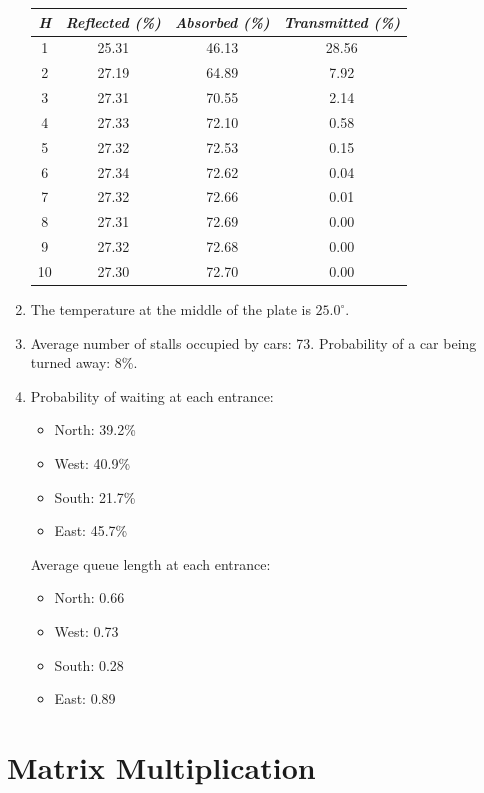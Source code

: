 \begin{enumerate}
\begin{tabular}{|c|c|c|c|}
\hline
{\it H}&{\it Reflected (\%)}&{\it Absorbed (\%)}&{\it Transmitted (\%)}\\
\hline
1 & 25.31 & 46.13 & 28.56 \\ 
2 & 27.19 & 64.89 &  7.92 \\
3 & 27.31 & 70.55 &  2.14 \\
4 & 27.33 & 72.10 &  0.58\\
5 & 27.32 & 72.53 &  0.15 \\
6 & 27.34 & 72.62 &  0.04 \\
7 & 27.32 & 72.66 &  0.01 \\
8 & 27.31 & 72.69 &  0.00 \\
9 & 27.32 & 72.68 &  0.00 \\
10 & 27.30 & 72.70 & 0.00 \\
\hline
\end{tabular}

\item The temperature at the middle of the plate is $25.0^{\circ}$.


\addtocounter{enumi}{1}
\addtocounter{enumi}{1}

\item Average number of stalls occupied by cars: 73.
      Probability of a car being turned away: 8\%.

\item Probability of waiting at each entrance:
      \begin{itemize}
      \item North: 39.2\%
      \item West: 40.9\%
      \item South: 21.7\%
      \item East: 45.7\%
      \end{itemize}
      Average queue length at each entrance:
      \begin{itemize}
      \item North: 0.66
      \item West: 0.73
      \item South: 0.28
      \item East: 0.89
      \end{itemize}

\end{enumerate}

\chapter{Matrix Multiplication}

